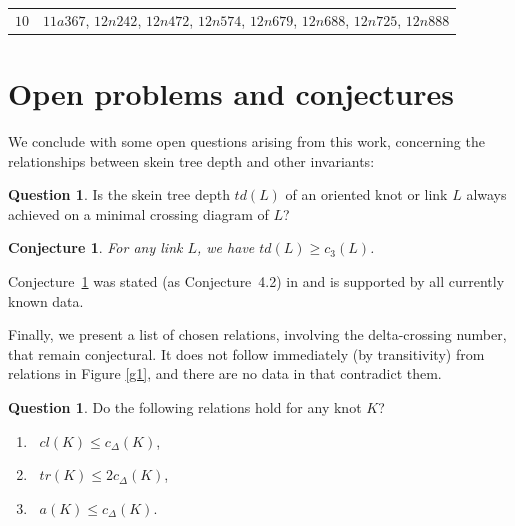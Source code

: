 \documentclass[pdftex, a4paper, 12pt, oneside]{amsart}
\numberwithin{equation}{section}
\theoremstyle{plain}
\newtheorem{conjecture}[theorem]{Conjecture}
\theoremstyle{definition}
\newtheorem{question}[theorem]{Question}
\begin{document}
\begin{footnotesize}
\begin{center}
\begin{longtable}[ht]{r||l}
				
				\\
				\hline
				$10$& $11a367$, $12n242$, $12n472$, $12n574$, $12n679$, $12n688$, $12n725$, $12n888$
				
				
			\end{longtable}
		\end{center}
		
	\end{footnotesize}
	
	\section{Open problems and conjectures}\label{s8}
	We conclude with some open questions arising from this work, concerning the relationships between skein tree depth and other invariants:
	
	\begin{question}\label{ques:minimal-diagram}
		Is the skein tree depth $td(L)$ of an oriented knot or link $L$ always achieved on a minimal crossing diagram of $L$? 
	\end{question}
	
	\begin{conjecture}\label{conj:triple}
		For any link $L$, we have $td(L) \ge c_3(L)$.
	\end{conjecture}
	
	Conjecture~\ref{conj:triple} was stated (as Conjecture~4.2) in \cite{Jab23} and is supported by all currently known data.
	
	Finally, we present a list of chosen relations, involving the delta-crossing number, that remain conjectural. It does not follow immediately (by transitivity) from relations in Figure \ref{g1}, and there are no data in \cite{LivMoo23} that contradict them.
	
	
	\begin{question}
		Do the following relations hold for any knot $K$? 
		
		\begin{enumerate}
			\item $\;\;cl(K) \leq c_{\Delta}(K)$,
			\item $\;\;tr(K) \leq 2c_{\Delta}(K)$,
			\item $\;\;a(K) \leq c_{\Delta}(K)$.
			
		\end{enumerate}
	\end{question}
	
\end{document}
